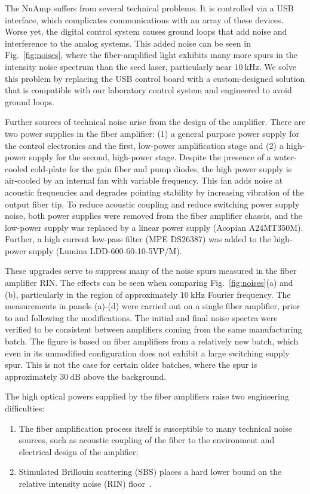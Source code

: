 \documentclass[twocolumn,aip,rsi,reprint,bibnotes]{revtex4-1}
\newcommand\unit[2]{\ensuremath{#1~\mathrm{{#2}}}}
\begin{document}
The NuAmp suffers from several technical problems.
It is controlled via a USB interface, which complicates communications with an array of these devices.
Worse yet, the digital control system causes ground loops that add noise and interference to the analog systems.
This added noise can be seen in Fig.~\ref{fig:noises}, where the fiber-amplified light exhibits many more spurs in the intensity noise spectrum than the seed laser, particularly near \unit{10}{kHz}.
We solve this problem by replacing the USB control board with a custom-designed solution that is compatible with our laboratory control system and engineered to avoid ground loops.


Further sources of technical noise arise from the design of the amplifier. There are two power supplies in the fiber amplifier: (1) a general purpose power supply for the control electronics and the first, low-power amplification stage and (2) a high-power supply for the second, high-power stage.
Despite the presence of a water-cooled cold-plate for the gain fiber and pump diodes, the high power supply is air-cooled by an internal fan with variable frequency.
This fan adds noise at acoustic frequencies and degrades pointing stability by increasing vibration of the output fiber tip.
To reduce acoustic coupling and reduce switching power supply noise, both power supplies were removed from the fiber amplifier chassis, and the low-power supply was replaced by a linear power supply (Acopian A24MT350M).
Further, a high current low-pass filter (MPE DS26387) was added to the high-power supply (Lumina LDD-600-60-10-5VP/M).

These upgrades serve to suppress many of the noise spurs measured in the fiber amplifier RIN.
The effects can be seen when comparing Fig.~\ref{fig:noises}(a) and (b), particularly in the region of approximately \unit{10}{kHz} Fourier frequency.
The measurements in panels (a)-(d) were carried out on a single fiber amplifier, prior to and following the modifications. The initial and final noise spectra were verified to be consistent between amplifiers coming from the same manufacturing batch.
The figure is based on fiber amplifiers from a relatively new batch, which even in its unmodified configuration does not exhibit a large switching supply spur.
This is not the case for certain older batches, where the spur is approximately \unit{30}{dB} above the background.

The high optical powers supplied by the fiber amplifiers raise two engineering difficulties:
\begin{enumerate}
  \item The fiber amplification process itself is susceptible to many technical noise sources, such as acoustic coupling of the fiber to the environment and electrical design of the amplifier;
  \item Stimulated Brillouin scattering (SBS) places a hard lower bound on the relative intensity noise (RIN) floor~\cite{Agrawal2013}.
\end{enumerate}
\end{document}
